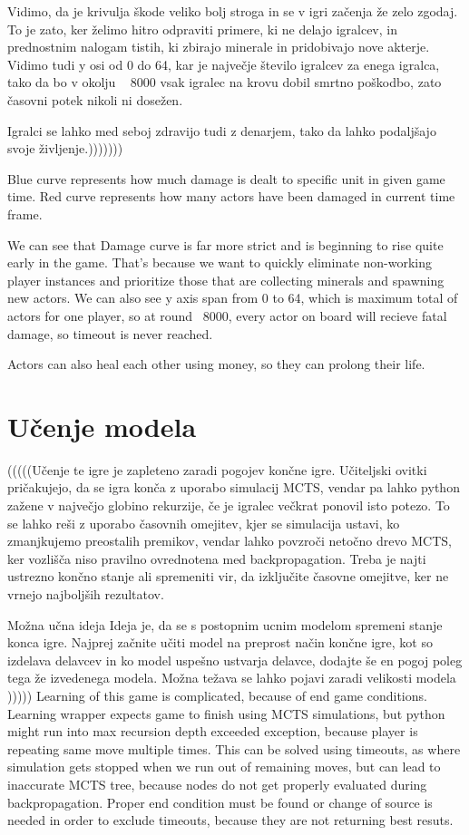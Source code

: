 \documentclass[a4paper, 12pt]{book}
\begin{document}
Vidimo, da je krivulja škode veliko bolj stroga in se v igri začenja že zelo zgodaj. To je zato, ker želimo hitro odpraviti primere, ki ne delajo igralcev, in prednostnim nalogam tistih, ki zbirajo minerale in pridobivajo nove akterje. Vidimo tudi y osi od 0 do 64, kar je največje število igralcev za enega igralca, tako da bo v okolju ~ 8000 vsak igralec na krovu dobil smrtno poškodbo, zato časovni potek nikoli ni dosežen.

Igralci se lahko med seboj zdravijo tudi z denarjem, tako da lahko podaljšajo svoje življenje.)))))))

Blue curve represents how much damage is dealt to specific unit in given game time. Red curve represents how many actors have been damaged in current time frame.

We can see that Damage curve is far more strict and is beginning to rise quite early in the game. That's because we want to quickly eliminate non-working player instances and prioritize those that are collecting minerals and spawning new actors. We can also see y axis span from 0 to 64, which is maximum total of actors for one player, so at round ~8000, every actor on board will recieve fatal damage, so timeout is never reached.

Actors can also heal each other using money, so they can prolong their life.


\chapter{Učenje modela}
\label{chucenjemodela}

(((((Učenje te igre je zapleteno zaradi pogojev končne igre. Učiteljski ovitki pričakujejo, da se igra konča z uporabo simulacij MCTS, vendar pa lahko python zažene v največjo globino rekurzije, če je igralec večkrat ponovil isto potezo.
To se lahko reši z uporabo časovnih omejitev, kjer se simulacija ustavi, ko zmanjkujemo preostalih premikov, vendar lahko povzroči netočno drevo MCTS, ker vozlišča niso pravilno ovrednotena med backpropagation.
Treba je najti ustrezno končno stanje ali spremeniti vir, da izključite časovne omejitve, ker ne vrnejo najboljših rezultatov.


Možna učna ideja
Ideja je, da se s postopnim ucnim modelom spremeni stanje konca igre. Najprej začnite učiti model na preprost način končne igre, kot so izdelava delavcev in ko model uspešno ustvarja delavce, dodajte še en pogoj poleg tega že izvedenega modela.
Možna težava se lahko pojavi zaradi velikosti modela
)))))
Learning of this game is complicated, because of end game conditions. Learning wrapper expects game to finish using MCTS simulations, but python might run into max recursion depth exceeded exception, because player is repeating same move multiple times.
This can be solved using timeouts, as where simulation gets stopped when we run out of remaining moves, but can lead to inaccurate MCTS tree, because nodes do not get properly evaluated during backpropagation.
Proper end condition must be found or change of source is needed in order to exclude timeouts, because they are not returning best resuts.
\end{document}
